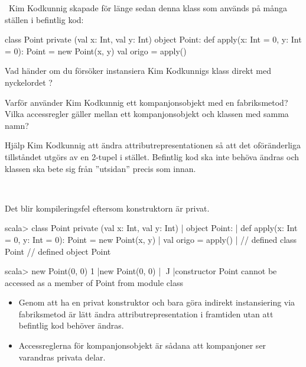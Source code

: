 \QUESTEND






\clearpage

\AdvancedTasks %



\QUESTBEGIN

\Task \what~Kim Kodkunnig skapade för länge sedan denna klass som används på många ställen i befintlig kod:

\begin{Code}
class Point private (val x: Int, val y: Int)
object Point:
    def apply(x: Int = 0, y: Int = 0): Point = new Point(x, y)
    val origo = apply()
\end{Code}

\Subtask Vad händer om du försöker instansiera Kim Kodkunnigs klass direkt med nyckelordet ?

\Subtask Varför använder Kim Kodkunnig ett kompanjonsobjekt med en fabriksmetod? Vilka accessregler gäller mellan ett kompanjonsobjekt och klassen med samma namn?

\Subtask Hjälp Kim Kodkunnig att ändra attributrepresentationen så att det oföränderliga tillståndet utgörs av en 2-tupel  i stället. Befintlig kod ska inte behöva ändras och klassen  ska bete sig från ''utsidan'' precis som innan.

\SOLUTION

\TaskSolved \what~

\SubtaskSolved Det blir kompileringsfel eftersom konstruktorn är privat.
\begin{REPL}
scala> class Point private (val x: Int, val y: Int)
     | object Point:
     |     def apply(x: Int = 0, y: Int = 0): Point = new Point(x, y)
     |     val origo = apply()
     |
// defined class Point
// defined object Point

scala> new Point(0, 0)
1 |new Point(0, 0)
  |    ^^^^^
  |constructor Point cannot be accessed as a member of Point from module class
\end{REPL}

\SubtaskSolved
\begin{itemize}
  \item Genom att ha en privat konstruktor och bara göra indirekt instansiering via fabriksmetod är lätt ändra attributrepresentation i framtiden utan att befintlig kod behöver ändras.

  \item Accessreglerna för kompanjonsobjekt är sådana att kompanjoner ser varandras privata delar.
\end{itemize}

